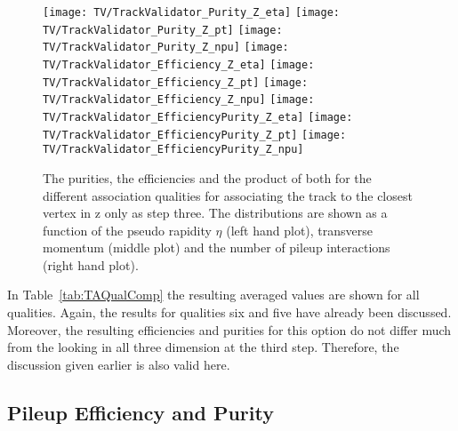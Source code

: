 \begin{figure}[h!t]
  \centering
  \texttt{[image: TV/TrackValidator\_Purity\_Z\_eta]}
  \texttt{[image: TV/TrackValidator\_Purity\_Z\_pt]}
  \texttt{[image: TV/TrackValidator\_Purity\_Z\_npu]}
  \newline
  \texttt{[image: TV/TrackValidator\_Efficiency\_Z\_eta]}
  \texttt{[image: TV/TrackValidator\_Efficiency\_Z\_pt]}
  \texttt{[image: TV/TrackValidator\_Efficiency\_Z\_npu]}
  \newline
  \texttt{[image: TV/TrackValidator\_EfficiencyPurity\_Z\_eta]}
  \texttt{[image: TV/TrackValidator\_EfficiencyPurity\_Z\_pt]}
  \texttt{[image: TV/TrackValidator\_EfficiencyPurity\_Z\_npu]}
  \caption[Purities, efficiencies and their product for the different quality of the association map with associating to the closest vertex in z only as third step]{The purities, the efficiencies and the product of both for the different association qualities for associating the track to the closest vertex in z only as step three. The distributions are shown as a function of the pseudo rapidity $\eta$ (left hand plot), transverse momentum (middle plot) and the number of pileup interactions (right hand plot). \label{plot:TASEFRDQZSignal}}
\end{figure}

In Table~\ref{tab:TAQualComp} the resulting averaged values are shown for all qualities. Again, the results for qualities six and five have already been discussed. Moreover, the resulting efficiencies and purities for this option do not differ much from the looking in all three dimension at the third step. Therefore, the discussion given earlier is also valid here. 



\subsection{Pileup Efficiency and Purity \label{sec:TAPUEFR}}

